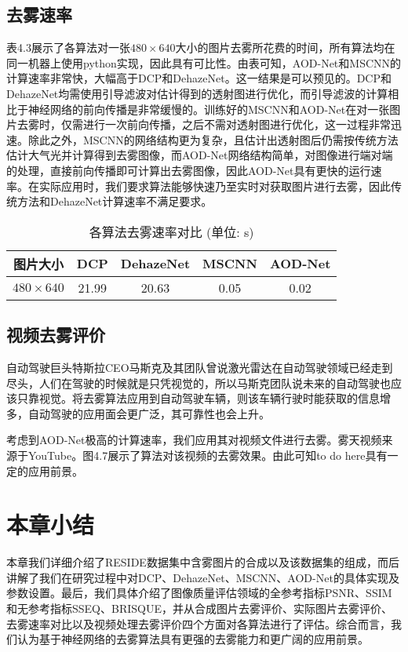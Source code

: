 \documentclass[a4paper, 12pt, oneside]{report}
\begin{document}
{\subsection{去雾速率\quad}
表4.3展示了各算法对一张$480 \times 640$大小的图片去雾所花费的时间，所有算法均在同一机器上使用python实现，因此具有可比性。由表可知，AOD-Net和MSCNN的计算速率非常快，大幅高于DCP和DehazeNet。这一结果是可以预见的。DCP和DehazeNet均需使用引导滤波对估计得到的透射图进行优化，而引导滤波的计算相比于神经网络的前向传播是非常缓慢的。训练好的MSCNN和AOD-Net在对一张图片去雾时，仅需进行一次前向传播，之后不需对透射图进行优化，这一过程非常迅速。除此之外，MSCNN的网络结构更为复杂，且估计出透射图后仍需按传统方法估计大气光并计算得到去雾图像，而AOD-Net网络结构简单，对图像进行端对端的处理，直接前向传播即可计算出去雾图像，因此AOD-Net具有更快的运行速率。在实际应用时，我们要求算法能够快速乃至实时对获取图片进行去雾，因此传统方法和DehazeNet计算速率不满足要求。

\begin{table}[htbp]
\centering
\caption{各算法去雾速率对比 (单位: s)}
\begin{tabular}{c|c|c|c|c}
\hline
图片大小 & DCP & DehazeNet	& MSCNN	& AOD-Net \\
\hline
$480\times  640$ & 21.99 & 20.63 & 0.05 & 0.02\\
\hline
\end{tabular}
\label{tab: 4.3}
\end{table}

\subsection{视频去雾评价\quad}
自动驾驶巨头特斯拉CEO马斯克及其团队曾说激光雷达在自动驾驶领域已经走到尽头，人们在驾驶的时候就是只凭视觉的，所以马斯克团队说未来的自动驾驶也应该只靠视觉。将去雾算法应用到自动驾驶车辆，则该车辆行驶时能获取的信息增多，自动驾驶的应用面会更广泛，其可靠性也会上升。

考虑到AOD-Net极高的计算速率，我们应用其对视频文件进行去雾。雾天视频来源于YouTube\cite{ref27}。图4.7展示了算法对该视频的去雾效果。由此可知to do here具有一定的应用前景。

\section{本章小结\quad}
本章我们详细介绍了RESIDE数据集中含雾图片的合成以及该数据集的组成，而后讲解了我们在研究过程中对DCP、DehazeNet、MSCNN、AOD-Net的具体实现及参数设置。最后，我们具体介绍了图像质量评估领域的全参考指标PSNR、SSIM和无参考指标SSEQ、BRISQUE，并从合成图片去雾评价、实际图片去雾评价、去雾速率对比以及视频处理去雾评价四个方面对各算法进行了评估。综合而言，我们认为基于神经网络的去雾算法具有更强的去雾能力和更广阔的应用前景。

}
\end{document}
